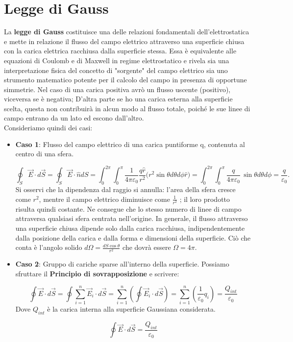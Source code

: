 \documentclass{book}
\begin{document}
\section{Legge di Gauss}
La \textbf{legge di Gauss} costituisce una delle relazioni fondamentali dell'elettrostatica e mette in relazione il flusso del campo elettrico attraverso una superficie chiusa con la carica elettrica racchiusa dalla superficie stessa. Essa è equivalente alle equazioni di Coulomb e di Maxwell in regime elettrostatico e rivela sia una interpretazione fisica del concetto di "sorgente" del campo elettrico sia uno strumento matematico potente per il calcolo del campo in presenza di opportune simmetrie.
Nel caso di una carica positiva avrò un flusso uscente (positivo), viceversa se è negativa; D'altra parte se ho una carica esterna alla superficie scelta, questa non contribuirà in alcun modo al flusso totale, poiché le sue linee di campo entrano da un lato ed escono dall'altro. 
\\
Consideriamo quindi dei casi:
\begin{itemize}
    \item 

 \textbf{Caso 1}: Flusso del campo elettrico di una carica puntiforme q, contenuta al centro di una sfera.

$$
\oint_{S}\vec{E}\cdot d\vec{S}
=\oint_{S}\vec{E}\cdot \hat{n}d{S}
=
\int_{0}^{2\pi} \int_{0}^{\pi}
\frac{1}{4\pi\varepsilon_0}\frac{q \hat{r}}{r^{2}}
\bigl(r^{2}\sin\theta d\theta d\phi \hat{r}\bigr)
=\int_{0}^{2\pi} \int_{0}^{\pi}\frac{q}{4\pi\varepsilon_0}\,\sin\theta d\theta d\phi= \frac{q}{\varepsilon_0}.
$$
Si osservi che la dipendenza dal raggio si annulla: l’area della sfera cresce come  $r^{2} $, mentre il campo elettrico diminuisce come $\frac{1}{r^{2}}$ ; il loro prodotto risulta quindi costante. Ne consegue che lo stesso numero di linee di campo attraversa qualsiasi sfera centrata nell’origine. In generale, il flusso attraverso una superficie chiusa dipende solo dalla carica racchiusa, indipendentemente dalla posizione della carica  e dalla forma e dimensioni della superficie.
Ciò che conta è l’angolo solido $d\Omega = \frac{dS\cos\theta}{r^{2}}$ che dovrà essere $\Omega=4\pi$. 

\item
\textbf{Caso 2}: Gruppo di cariche sparse all'interno della superficie.
Possiamo sfruttare il \textbf{Principio di sovrapposizione} e scrivere:

\[
\oint \vec{E} \cdot d\vec{S}
=  \oint \sum_{i=1}^{n}\vec{E}_i \cdot d\vec{S} 
= \sum_{i=1}^{n} \left( \oint \vec{E}_i \cdot d\vec{S} \right)
= \sum_{i=1}^{n} \left( \frac{1}{\varepsilon_0} q_i \right)=  \frac{Q_{int}}{\varepsilon_0}  
\]
Dove $Q_{int}$ è la carica interna alla superficie Gaussiana considerata. 

\[
\boxed{
\oint \vec{E} \cdot d\vec{S}
= \frac{Q_{int}}{\varepsilon_0} 
}
\]

\end{itemize}
\end{document}
